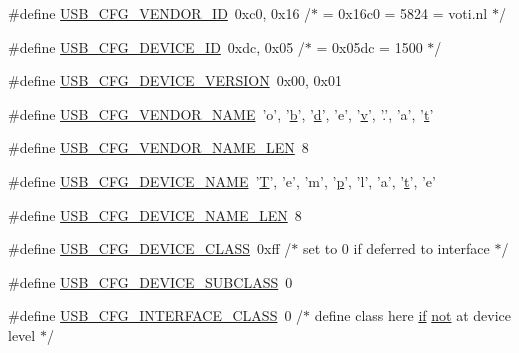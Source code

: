 \begin{DoxyCompactItemize}
\item 
\#define \hyperlink{usbconfig-prototype_8h_a9326b8ec9f809ce66d54349691646930}{U\-S\-B\-\_\-\-C\-F\-G\-\_\-\-V\-E\-N\-D\-O\-R\-\_\-\-I\-D}~0xc0, 0x16 /$\ast$ = 0x16c0 = 5824 = voti.\-nl $\ast$/
\item 
\#define \hyperlink{usbconfig-prototype_8h_abc740455309399430b0f49bf7931d1d7}{U\-S\-B\-\_\-\-C\-F\-G\-\_\-\-D\-E\-V\-I\-C\-E\-\_\-\-I\-D}~0xdc, 0x05 /$\ast$ = 0x05dc = 1500 $\ast$/
\item 
\#define \hyperlink{usbconfig-prototype_8h_aba3c7c0cd4055ba3bbf5df38e57b6d27}{U\-S\-B\-\_\-\-C\-F\-G\-\_\-\-D\-E\-V\-I\-C\-E\-\_\-\-V\-E\-R\-S\-I\-O\-N}~0x00, 0x01
\item 
\#define \hyperlink{usbconfig-prototype_8h_a25a2baf5c8feb0982a47050423add0ec}{U\-S\-B\-\_\-\-C\-F\-G\-\_\-\-V\-E\-N\-D\-O\-R\-\_\-\-N\-A\-M\-E}~'o', '\hyperlink{IMU_8cpp_a20f3a6e8a2ba2537edf801801628417b}{b}', '\hyperlink{OWGeneric__DangerShield_8ino_a22871ee78191bcd7676a38358795104e}{d}', 'e', '\hyperlink{arm__acle_8h_a8603782009ff58be0587ea58013b3e52}{v}', '.', 'a', '\hyperlink{Yun__Log__BatteryDisCharging_8ino_a1ffe6f4d89de83b8119fa91af85fcacc}{t}'
\item 
\#define \hyperlink{usbconfig-prototype_8h_a3085d820d9dc6e939737a3f1b9a457d7}{U\-S\-B\-\_\-\-C\-F\-G\-\_\-\-V\-E\-N\-D\-O\-R\-\_\-\-N\-A\-M\-E\-\_\-\-L\-E\-N}~8
\item 
\#define \hyperlink{usbconfig-prototype_8h_a9b482a2b2740652ffe7dcb6695ca0c91}{U\-S\-B\-\_\-\-C\-F\-G\-\_\-\-D\-E\-V\-I\-C\-E\-\_\-\-N\-A\-M\-E}~'\hyperlink{Yun__Log__BatteryDisCharging_8ino_a1e59dd36aafb310776e617456b9415b5}{T}', 'e', 'm', '\hyperlink{arm__acle_8h_a17729ed10bd08e58e27292b8429a1a76}{p}', 'l', 'a', '\hyperlink{Yun__Log__BatteryDisCharging_8ino_a1ffe6f4d89de83b8119fa91af85fcacc}{t}', 'e'
\item 
\#define \hyperlink{usbconfig-prototype_8h_ae68f17e6baf13805abc56e74beadeb57}{U\-S\-B\-\_\-\-C\-F\-G\-\_\-\-D\-E\-V\-I\-C\-E\-\_\-\-N\-A\-M\-E\-\_\-\-L\-E\-N}~8
\item 
\#define \hyperlink{usbconfig-prototype_8h_a9ce4f96ad98b3db8205691e8bc723e55}{U\-S\-B\-\_\-\-C\-F\-G\-\_\-\-D\-E\-V\-I\-C\-E\-\_\-\-C\-L\-A\-S\-S}~0xff    /$\ast$ set to 0 if deferred to interface $\ast$/
\item 
\#define \hyperlink{usbconfig-prototype_8h_a89e5ad66f8b835866e7d836c73bfd30d}{U\-S\-B\-\_\-\-C\-F\-G\-\_\-\-D\-E\-V\-I\-C\-E\-\_\-\-S\-U\-B\-C\-L\-A\-S\-S}~0
\item 
\#define \hyperlink{usbconfig-prototype_8h_a34f6fe9486b66e8220a82a0eb87a7447}{U\-S\-B\-\_\-\-C\-F\-G\-\_\-\-I\-N\-T\-E\-R\-F\-A\-C\-E\-\_\-\-C\-L\-A\-S\-S}~0   /$\ast$ define class here \hyperlink{mm__malloc_8h_a682140772a1d7d2744289e6abb2ad2ff}{if} \hyperlink{iso646_8h_a31739c27bdcfdac9faae7bf7a5df49e4}{not} at device level $\ast$/

\end{DoxyCompactItemize}
